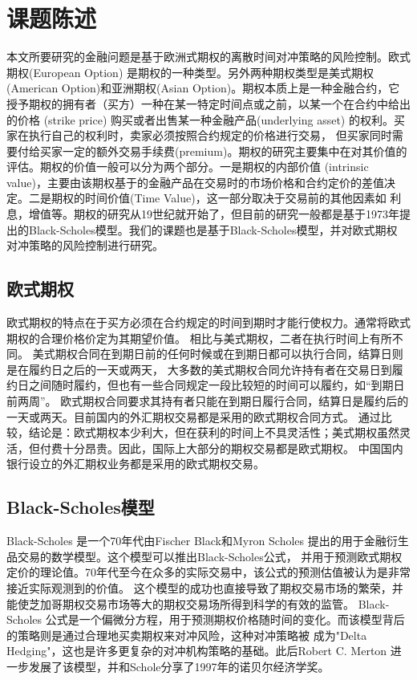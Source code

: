 \chapter{课题陈述}
\label{chp:2}

本文所要研究的金融问题是基于欧洲式期权的离散时间对冲策略的风险控制。欧式期权(European Option) 是期权的一种类型。另外两种期权类型是美式期权
(American Option)和亚洲期权(Asian Option)。期权本质上是一种金融合约，它授予期权的拥有者（买方）一种在某一特定时间点或之前，以某一个在合约中给出的价格
(strike price) 购买或者出售某一种金融产品(underlying asset) 的权利。买家在执行自己的权利时，卖家必须按照合约规定的价格进行交易，
但买家同时需要付给买家一定的额外交易手续费(premium)。期权的研究主要集中在对其价值的评估。期权的价值一般可以分为两个部分。一是期权的内部价值
(intrinsic value)，主要由该期权基于的金融产品在交易时的市场价格和合约定价的差值决定。二是期权的时间价值(Time Value)，这一部分取决于交易前的其他因素如
利息，增值等。期权的研究从19世纪就开始了，但目前的研究一般都是基于1973年提出的Black-Scholes模型。我们的课题也是基于Black-Scholes模型，并对欧式期权
对冲策略的风险控制进行研究。

\section{欧式期权} %
\label{sec:euroOption}

欧式期权的特点在于买方必须在合约规定的时间到期时才能行使权力。通常将欧式期权的合理价格价定为其期望价值。
相比与美式期权，二者在执行时间上有所不同。
美式期权合同在到期日前的任何时候或在到期日都可以执行合同，结算日则是在履约日之后的一天或两天，
大多数的美式期权合同允许持有者在交易日到履约日之间随时履约，但也有一些合同规定一段比较短的时间可以履约，如“到期日前两周”。
欧式期权合同要求其持有者只能在到期日履行合同，结算日是履约后的一天或两天。目前国内的外汇期权交易都是采用的欧式期权合同方式。
通过比较，结论是：欧式期权本少利大，但在获利的时间上不具灵活性；美式期权虽然灵活，但付费十分昂贵。因此，国际上大部分的期权交易都是欧式期权。
中国国内银行设立的外汇期权业务都是采用的欧式期权交易。


\section{Black-Scholes模型} %
\label{sec:BlackScholes}

Black-Scholes 是一个70年代由Fischer Black和Myron Scholes 提出的用于金融衍生品交易的数学模型。这个模型可以推出Black-Scholes公式，
并用于预测欧式期权定价的理论值。70年代至今在众多的实际交易中，该公式的预测估值被认为是非常接近实际观测到的价值。
这个模型的成功也直接导致了期权交易市场的繁荣，并能使芝加哥期权交易市场等大的期权交易场所得到科学的有效的监管。
Black-Scholes 公式是一个偏微分方程，用于预测期权价格随时间的变化。而该模型背后的策略则是通过合理地买卖期权来对冲风险，这种对冲策略被
成为"Delta Hedging"，这也是许多更复杂的对冲机构策略的基础。此后Robert C. Merton 进一步发展了该模型，并和Schole分享了1997年的诺贝尔经济学奖。


